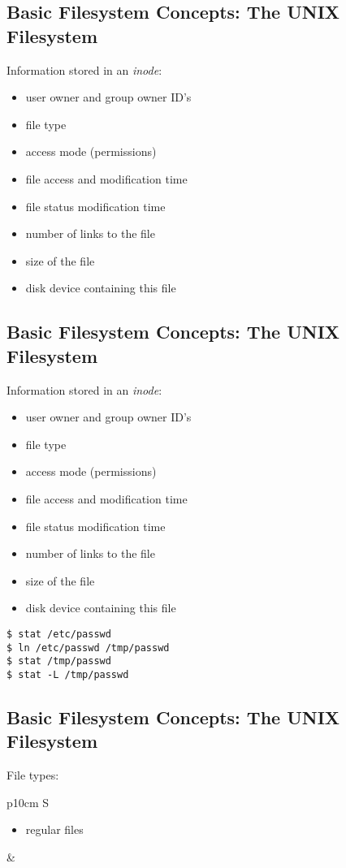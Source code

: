 \documentclass[xga]{xdvislides}
\begin{document}
\subsection{Basic Filesystem Concepts: The UNIX Filesystem}
Information stored in an {\em inode}:
\begin{itemize}
	\item user owner and group owner ID's
	\item file type
	\item access mode (permissions)
	\item file access and modification time
	\item file status modification time
	\item number of links to the file
	\item size of the file
	\item disk device containing this file
\end{itemize}

\subsection{Basic Filesystem Concepts: The UNIX Filesystem}
Information stored in an {\em inode}:
\begin{itemize}
	\item user owner and group owner ID's
	\item file type
	\item access mode (permissions)
	\item file access and modification time
	\item file status modification time
	\item number of links to the file
	\item size of the file
	\item disk device containing this file
\end{itemize}

\begin{verbatim}
$ stat /etc/passwd
$ ln /etc/passwd /tmp/passwd
$ stat /tmp/passwd
$ stat -L /tmp/passwd
\end{verbatim}

\subsection{Basic Filesystem Concepts: The UNIX Filesystem}
File types:
\\

\begin{tabular}{ p{10cm} S }
\begin{itemize}
	\item regular files
\end{itemize}
&  \\
\end{tabular}
\\
\end{document}
